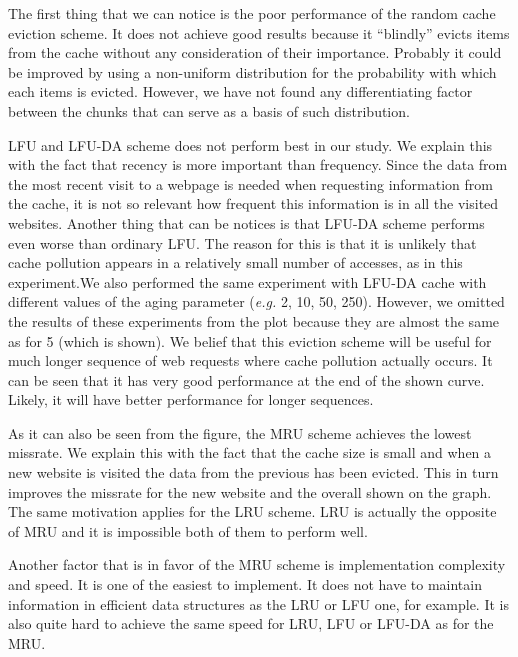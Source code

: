 The first thing that we can notice is the poor performance of the random cache eviction scheme. It does not achieve 
good results because it ``blindly'' evicts items from the cache without any consideration of their importance. Probably
it could be improved by using a non-uniform distribution for the probability with which each items is evicted. However,
we have not found any differentiating factor between the chunks that can serve as a basis of such distribution.

LFU and LFU-DA scheme does not perform best in our study. We explain this with the fact that recency is more important
than frequency. Since the data from the most recent visit to a webpage is needed when requesting information from the 
cache, it is not so relevant how frequent this information is in all the visited websites. Another thing that can be
notices is that LFU-DA scheme performs even worse than ordinary LFU. The reason for this is that it is unlikely that
cache pollution appears in a relatively small number of accesses, as in this experiment.We also performed the same experiment with LFU-DA cache with different values of the aging parameter (\textit{e.g.} 2, 10, 50, 250). However, we omitted the results of these experiments from the plot because they are almost the same as for 5 (which is shown). We 
belief that this eviction scheme will be useful for much longer sequence of web requests where cache pollution actually occurs. It can be seen that it has very good performance at the end of the shown curve. Likely, it will have better performance for longer sequences.

As it can also be seen from the figure, the MRU scheme achieves the lowest missrate. We explain this with the fact that
the cache size is small and when a new website is visited the data from the previous has been evicted. This in turn
improves the missrate for the new website and the overall shown on the graph. The same motivation applies for the 
LRU scheme. LRU is actually the opposite of MRU and it is impossible both of them to perform well. 

Another factor that is in favor of the MRU scheme is implementation complexity and speed. It is one of the easiest to
implement. It does not have to maintain information in efficient data structures as the LRU or LFU one, for example. 
It is also quite hard to achieve the same speed for LRU, LFU or LFU-DA as for the MRU.

